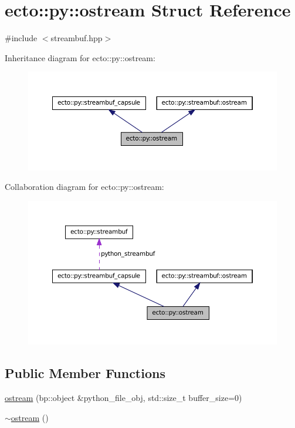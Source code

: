 \hypertarget{structecto_1_1py_1_1ostream}{\section{ecto\-:\-:py\-:\-:ostream \-Struct \-Reference}
\label{structecto_1_1py_1_1ostream}
}


{\ttfamily \#include $<$streambuf.\-hpp$>$}



\-Inheritance diagram for ecto\-:\-:py\-:\-:ostream\-:\nopagebreak
\begin{figure}[H]
\begin{center}
\leavevmode
\includegraphics[width=350pt]{structecto_1_1py_1_1ostream__inherit__graph}
\end{center}
\end{figure}


\-Collaboration diagram for ecto\-:\-:py\-:\-:ostream\-:\nopagebreak
\begin{figure}[H]
\begin{center}
\leavevmode
\includegraphics[width=350pt]{structecto_1_1py_1_1ostream__coll__graph}
\end{center}
\end{figure}
\subsection*{\-Public \-Member \-Functions}
\begin{DoxyCompactItemize}
\item 
\hyperlink{structecto_1_1py_1_1ostream_a5fc23212b0b77a69a0c4e7e67133b2c8}{ostream} (bp\-::object \&python\-\_\-file\-\_\-obj, std\-::size\-\_\-t buffer\-\_\-size=0)
\item 
\hyperlink{structecto_1_1py_1_1ostream_a69cba9ec021b14b76fd08d35ea322434}{$\sim$ostream} ()
\end{DoxyCompactItemize}


